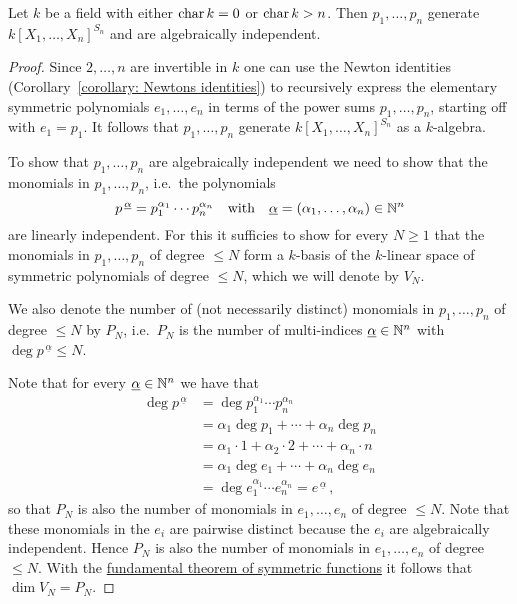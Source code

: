 \begin{theorem}
  Let $k$ be a field with either $\operatorname{char} k = 0$ or $\operatorname{char} k > n$.
  Then $p_1, \dotsc, p_n$ generate $k[X_1, \dotsc, X_n]^{S_n}$ and are algebraically independent.
\end{theorem}
\begin{proof}
  Since $2, \dotsc, n$ are invertible in $k$ one can use the Newton identities (Corollary~\ref{corollary: Newtons identities}) to recursively express the elementary symmetric polynomials $e_1, \dotsc, e_n$ in terms of the power sums $p_1, \dotsc, p_n$, starting off with $e_1 = p_1$.
  It follows that $p_1, \dotsc, p_n$ generate $k[X_1, \dotsc, X_n]^{S_n}$ as a $k$-algebra.
  
  To show that $p_1, \dotsc, p_n$ are algebraically independent we need to show that the monomials in $p_1, \dotsc, p_n$, i.e.\ the polynomials
  \[
      p^{\,\underline{\alpha}}
    = p_1^{\alpha_1} \dotsm p_n^{\alpha_n}
    \quad\text{with}\quad
        \underline{\alpha}
    =   (\alpha_1, \dotsc, \alpha_n)
    \in \mathbb{N}^n
  \]
  are linearly independent.
  For this it sufficies to show for every $N \geq 1$ that the monomials in $p_1, \dotsc, p_n$ of degree $\leq N$ form a $k$-basis of the $k$-linear space of symmetric polynomials of degree $\leq N$, which we will denote by $V_N$.
  
  We also denote the number of (not necessarily distinct) monomials in $p_1, \dotsc, p_n$ of degree $\leq N$ by $P_N$, i.e.\ $P_N$ is the number of multi-indices $\underline{\alpha} \in \mathbb{N}^n$ with $\deg p^{\,\underline{\alpha}} \leq N$.
  
  Note that for every $\underline{\alpha} \in \mathbb{N}^n$ we have that
  \begin{align*}
        \deg p^{\,\underline{\alpha}}
    &=  \deg
        p_1^{\alpha_1}
        \dotsm 
        p_n^{\alpha_n} \\
    &=    \alpha_1 \deg p_1
        + \dotsb 
        + \alpha_n \deg p_n \\
    &=    \alpha_1 \cdot 1
        + \alpha_2 \cdot 2
        + \dotsb
        + \alpha_n \cdot n  \\
    &=    \alpha_1 \deg e_1
        + \dotsb 
        + \alpha_n \deg e_n \\
    &=  \deg
        e_1^{\alpha_1}
        \dotsm 
        e_n^{\alpha_n}
     =  e^{\,\underline{\alpha}} \,,
  \end{align*}
  so that $P_N$ is also the number of monomials in $e_1, \dotsc, e_n$ of degree $\leq N$.
  Note that these monomials in the $e_i$ are pairwise distinct because the $e_i$ are algebraically independent.
  Hence $P_N$ is also the number of monomials in $e_1, \dotsc, e_n$ of degree $\leq N$.
  With the \hyperref[theorem: fundamental theorem of symmetric functions]{fundamental theorem of symmetric functions} it follows that $\dim V_N = P_N$.
  

\end{proof}
